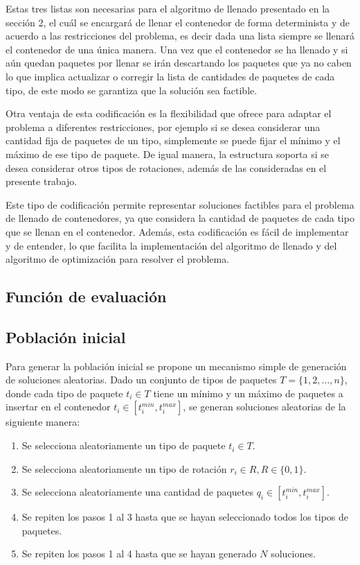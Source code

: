 Estas tres listas son necesarias para el algoritmo de llenado presentado en la sección 2, el cuál se encargará de llenar el contenedor de forma determinista y de acuerdo a las restricciones del problema, es decir dada una lista siempre se llenará el contenedor de una única manera. Una vez que el contenedor se ha llenado y si aún quedan paquetes por llenar se irán descartando los paquetes que ya no caben lo que implica actualizar o corregir la lista de cantidades de paquetes de cada tipo, de este modo se garantiza que la solución sea factible.

Otra ventaja de esta codificación es la flexibilidad que ofrece para adaptar el problema a diferentes restricciones, por ejemplo si se desea considerar una cantidad fija de paquetes de un tipo, simplemente se puede fijar el mínimo y el máximo de ese tipo de paquete. De igual manera, la estructura soporta si se desea considerar otros tipos de rotaciones, además de las consideradas en el presente trabajo. 

Este tipo de codificación permite representar soluciones factibles para el problema de llenado de contenedores, ya que considera la cantidad de paquetes de cada tipo que se llenan en el contenedor. Además, esta codificación es fácil de implementar y de entender, lo que facilita la implementación del algoritmo de llenado y del algoritmo de optimización para resolver el problema.

\subsection{Función de evaluación}


    
\subsection{Población inicial}

Para generar la población inicial se propone un mecanismo simple de generación de soluciones aleatorias. Dado un conjunto de tipos de paquetes $T = \{1,2, \ldots, n\}$, donde cada tipo de paquete $t_i \in T$ tiene un mínimo y un máximo de paquetes a insertar en el contenedor $t_i \in [t_i^{min},t_i^{max}]$, se generan soluciones aleatorias de la siguiente manera:

\begin{enumerate}
\item Se selecciona aleatoriamente un tipo de paquete $t_i \in T$.
\item Se selecciona aleatoriamente un tipo de rotación $r_i \in R, R \in \{0,1\}$.
\item Se selecciona aleatoriamente una cantidad de paquetes $q_i \in [t_i^{min},t_i^{max}]$.
\item Se repiten los pasos 1 al 3 hasta que se hayan seleccionado todos los tipos de paquetes.
\item Se repiten los pasos 1 al 4 hasta que se hayan generado $N$ soluciones.
\end{enumerate}


